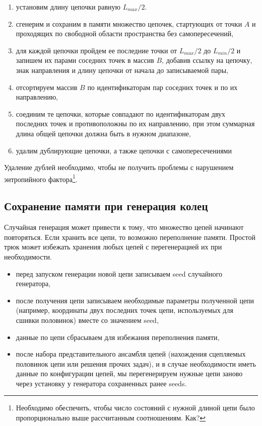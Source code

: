 \documentclass[tikz,a4paper]{scrartcl} %
\begin{document}
\begin{enumerate}
\item установим длину цепочки равную $L_{max}/2$.
\item сгенерим и сохраним в памяти множество цепочек, стартующих от точки $A$ и проходящих по свободной области пространства без самопересечений,
\item для каждой цепочки пройдем ее последние точки от $L_{max}/2$ до $L_{min}/2$ и запишем их парами соседних точек в массив $B$, добавив ссылку на цепочку, знак направления и длину цепочки от начала до записываемой пары,
\item отсортируем массив $B$ по идентификаторам пар соседних точек и по их направлению,
\item соединим те цепочки, которые совпадают по идентификаторам двух последних точек и противоположны по их направлению, при этом суммарная длина общей цепочки должна быть в нужном диапазоне,
\item удалим дублирующие цепочки, а также цепочки с самопересечениями
\end{enumerate}

Удаление дублей необходимо, чтобы не получить проблемы с нарушением энтропийного фактора\footnote{Необходимо обеспечить, чтобы число состояний с нужной длиной цепи было пропорционально выше рассчитанным соотношениям. Как?}. 

\subsection*{Сохранение памяти при генерация колец}
Случайная генерация может привести к тому, что множество цепей начинают повторяться. Если хранить все цепи, то возможно переполнение памяти. Простой трюк может избежать хранения любых цепей с перегенерацией их при необходимости.
\begin{itemize}
\item перед запуском генерации новой цепи записываем seed случайного генератора,
\item после получения цепи записываем необходимые параметры полученной цепи (например, координаты двух последних точек цепи, используемых для сшивки половинок) вместе со значением seed,
\item данные по цепи сбрасываем для избежания переполнения памяти,
\item после набора представительного ансамбля цепей (нахождения сцепляемых половинок цепи или решения прочих задач), и в случае необходимости иметь данные по конфигурации цепей, мы перегенерируем нужные цепи заново через установку у генератора сохраненных ранее seeds.
\end{itemize}
\end{document}
